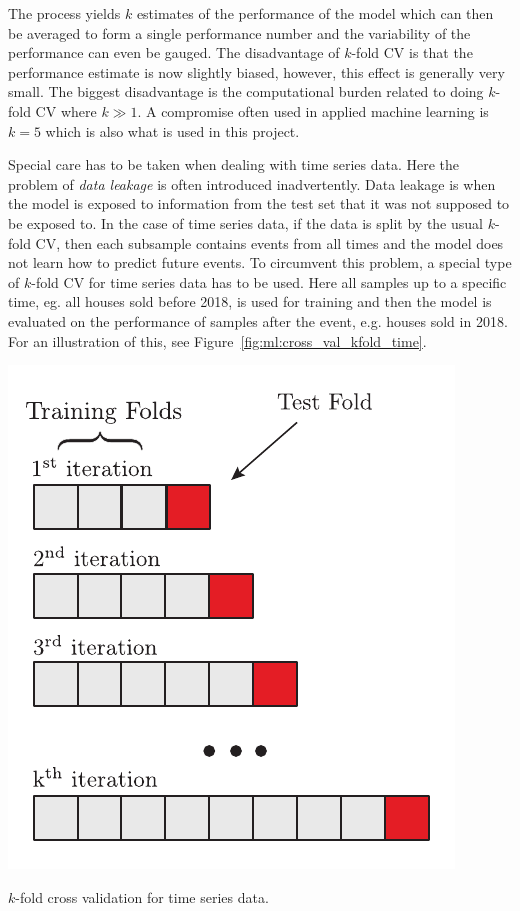 The process yields $k$ estimates of the performance of the model which can then be averaged to form a single performance number and the variability of the performance can even be gauged. The disadvantage of $k$-fold CV is that the performance estimate is now slightly biased, however, this effect is generally very small. The biggest disadvantage is the computational burden related to doing $k$-fold CV where $k\gg 1$. A compromise often used in applied machine learning is $k=5$ which is also what is used in this project.  

Special care has to be taken when dealing with time series data. Here the problem of \emph{data leakage} is often introduced inadvertently. Data leakage is when the model is exposed to information from the test set that it was not supposed to be exposed to. In the case of time series data, if the data is split by the usual $k$-fold CV, then each subsample contains events from all times and the model does not learn how to predict future events. To circumvent this problem, a special type of $k$-fold CV for time series data has to be used. Here all samples up to a specific time, eg. all houses sold before 2018, is used for training and then the model is evaluated on the performance of samples after the event, e.g. houses sold in \num{2018}. For an illustration of this, see Figure~\ref{fig:ml:cross_val_kfold_time}.

\begin{marginfigure}[-6cm]
  \includegraphics[width=\textwidth, trim=5 5 5 5, clip]{figures/cross_validation/kfold_time.pdf}
  \caption[$k$-Fold Cross Validation for Time Series Data]
    {$k$-fold cross validation for time series data. 
    }
  \label{fig:ml:cross_val_kfold_time}
\end{marginfigure} 

